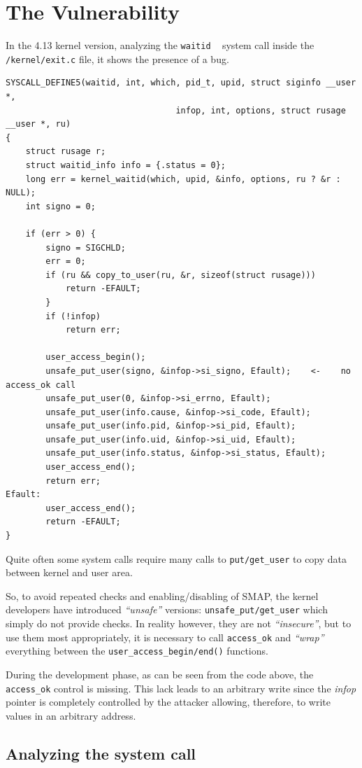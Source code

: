 \documentclass{masterthesis}
\begin{document}
\section{The Vulnerability}
\label{sect:vulnerability_17}
In the 4.13 kernel version, analyzing the \texttt{waitid} ~\cite{waitid} system call inside the \texttt{/kernel/exit.c} file, it shows the presence of a bug.
\begin{lstlisting}
SYSCALL_DEFINE5(waitid, int, which, pid_t, upid, struct siginfo __user *,
                                  infop, int, options, struct rusage __user *, ru)
{
    struct rusage r;
    struct waitid_info info = {.status = 0};
    long err = kernel_waitid(which, upid, &info, options, ru ? &r : NULL);
    int signo = 0;

    if (err > 0) {
        signo = SIGCHLD;
        err = 0;
        if (ru && copy_to_user(ru, &r, sizeof(struct rusage)))
            return -EFAULT;
        }
        if (!infop)
            return err;

        user_access_begin();
        unsafe_put_user(signo, &infop->si_signo, Efault);    <-    no access_ok call
        unsafe_put_user(0, &infop->si_errno, Efault);
        unsafe_put_user(info.cause, &infop->si_code, Efault);
        unsafe_put_user(info.pid, &infop->si_pid, Efault);
        unsafe_put_user(info.uid, &infop->si_uid, Efault);
        unsafe_put_user(info.status, &infop->si_status, Efault);
        user_access_end();
        return err;
Efault:
        user_access_end();
        return -EFAULT;
}
\end{lstlisting}
Quite often some system calls require many calls to \texttt{put/get_user} to copy data between kernel and user area.

So, to avoid repeated checks and enabling/disabling of SMAP, the kernel developers have introduced \emph{``unsafe''} versions: \texttt{unsafe_put/get_user} which simply do not provide checks.
In reality however, they are not \emph{``insecure''}, but to use them most appropriately, it is necessary to call \texttt{access\_ok} and \emph{``wrap''} everything between the \texttt{user_access_begin/end()} functions.


During the development phase, as can be seen from the code above, the \texttt{access_ok} control is missing.
This lack leads to an arbitrary write since the \textit{infop} pointer is completely controlled by the attacker allowing, therefore, to write values in an arbitrary address.

\subsection{Analyzing the system call}
\label{subsect:waitid}
\end{document}
